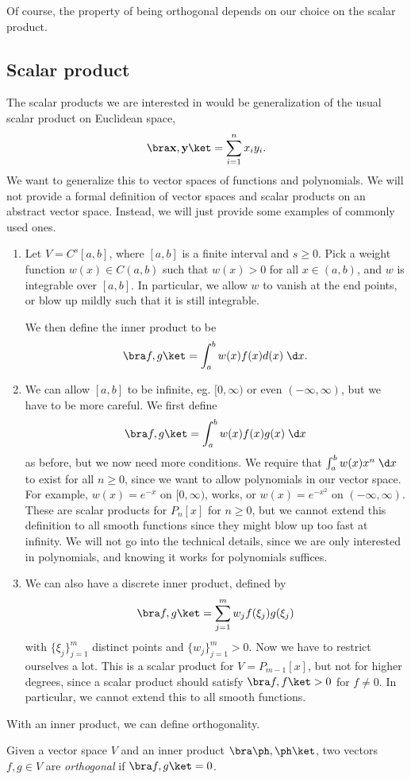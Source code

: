 \documentclass[a4paper]{article}
\begin{document}
Of course, the property of being orthogonal depends on our choice on the scalar product.

\subsection{Scalar product}
The scalar products we are interested in would be generalization of the usual scalar product on Euclidean space,
\[
  \bra \mathbf{x}, \mathbf{y}\ket = \sum_{i = 1}^n x_i y_i.
\]
We want to generalize this to vector spaces of functions and polynomials. We will not provide a formal definition of vector spaces and scalar products on an abstract vector space. Instead, we will just provide some examples of commonly used ones.
\begin{eg}\leavevmode
  \begin{enumerate}
    \item Let $V = C^s[a, b]$, where $[a, b]$ is a finite interval and $s \geq 0$. Pick a weight function $w(x) \in C(a, b)$ such that $w(x) > 0$ for all $x \in (a, b)$, and $w$ is integrable over $[a, b]$. In particular, we allow $w$ to vanish at the end points, or blow up mildly such that it is still integrable.

      We then define the inner product to be
      \[
        \bra f, g\ket = \int_a^b w(x) f(x) d(x)\;\d x.
      \]
    \item We can allow $[a, b]$ to be infinite, eg. $[0, \infty)$ or even $(-\infty, \infty)$, but we have to be more careful. We first define
      \[
        \bra f, g\ket = \int_a^b w(x) f(x) g(x) \;\d x
      \]
      as before, but we now need more conditions. We require that $\int_a^b w(x) x^n\;\d x$ to exist for all $n \geq 0$, since we want to allow polynomials in our vector space. For example, $w(x) = e^{-x}$ on $[0, \infty)$, works, or $w(x) = e^{-x^2}$ on $(-\infty, \infty)$. These are scalar products for $P_n[x]$ for $n \geq 0$, but we cannot extend this definition to all smooth functions since they might blow up too fast at infinity. We will not go into the technical details, since we are only interested in polynomials, and knowing it works for polynomials suffices.
    \item We can also have a discrete inner product, defined by
      \[
        \bra f, g\ket = \sum_{j = 1}^m w_j f(\xi_j) g(\xi_j)
      \]
      with $\{\xi_j\}_{j = 1}^m$ distinct points and $\{w_j\}_{j = 1}^m > 0$. Now we have to restrict ourselves a lot. This is a scalar product for $V = P_{m - 1}[x]$, but not for higher degrees, since a scalar product should satisfy $\bra f, f \ket > 0$ for $f \not= 0$. In particular, we cannot extend this to all smooth functions.
  \end{enumerate}
\end{eg}
With an inner product, we can define orthogonality.
\begin{defi}[Orthogonalilty]
  Given a vector space $V$ and an inner product $\bra \ph, \ph\ket$, two vectors $f, g \in V$ are \emph{orthogonal} if $\bra f, g\ket = 0$.
\end{defi}
\end{document}
